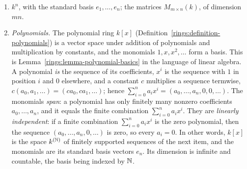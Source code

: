 \begin{example}\label{linear-algebra:example-vector-spaces}
\begin{enumerate}
\item $k^n$, with the standard basis $e_1, \ldots, e_n$; the matrices $M_{m \times n}(k)$, of dimension $mn$.
\item \emph{Polynomials.} The polynomial ring $k[x]$ (Definition~\ref{rings:definition-polynomials}) is a vector space under addition of polynomials and multiplication by constants, and the monomials
$1, x, x^2, \ldots$ form a basis. This is Lemma~\ref{rings:lemma-polynomial-basics} in the language of linear algebra. A polynomial \emph{is} the sequence of its coefficients, $x^i$ is the sequence with $1$ in position $i$
and $0$ elsewhere, and a constant $c$ multiplies a sequence termwise, $c(a_0, a_1, \ldots) = (ca_0, ca_1, \ldots)$; hence $\sum_{i=0}^na_ix^i = (a_0, \ldots, a_n, 0, 0, \ldots)$. The monomials \emph{span}: a polynomial has
only finitely many nonzero coefficients $a_0, \ldots, a_n$, and it equals the finite combination $\sum_{i=0}^na_ix^i$. They are \emph{linearly independent}: if a finite combination $\sum_{i=0}^na_ix^i$ is the zero
polynomial, then the sequence $(a_0, \ldots, a_n, 0, \ldots)$ is zero, so every $a_i = 0$. In other words, $k[x]$ is the space $k^{(\mathbb{N})}$ of finitely supported sequences of the next item, and the monomials are its standard
basis vectors $e_n$. Its dimension is infinite and countable, the basis being indexed by $\mathbb{N}$.


\end{enumerate}
\end{example}
